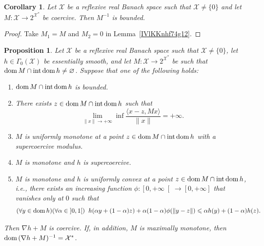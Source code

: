 \documentclass[a4paper,11pt,fleqn]{article}
\renewcommand{\leq}{\ensuremath{\leqslant}}
\newcommand{\pair}[2]{\langle{{#1},{#2}}\rangle}
\newcommand{\XX}{\ensuremath{{\mathcal X}}}
\newcommand{\emp}{\ensuremath{{\varnothing}}}
\newcommand{\pinf}{\ensuremath{{+\infty}}}
\newcommand{\dom}{\ensuremath{\text{\rm dom}\,}}
\newcommand{\intdom}{\ensuremath{\text{\rm int\,dom}\,}}
\newtheorem{corollary}[theorem]{Corollary}
\newtheorem{proposition}[theorem]{Proposition}
\theoremstyle{plain}{\theorembodyfont{\rmfamily}%
\newtheorem{conjecture}[theorem]{Conjecture}}
\theoremstyle{plain}{\theorembodyfont{\rmfamily}%
\newtheorem{example}[theorem]{Example}}
\theoremstyle{plain}{\theorembodyfont{\rmfamily}%
\newtheorem{remark}[theorem]{Remark}}
\theoremstyle{plain}{\theorembodyfont{\rmfamily}%
\newtheorem{algorithm}[theorem]{Algorithm}}
\theoremstyle{plain}{\theorembodyfont{\rmfamily}%
\newtheorem{condition}[theorem]{Condition}}
\theoremstyle{plain}{\theorembodyfont{\rmfamily}%
\newtheorem{definition}[theorem]{Definition}}
\theoremstyle{plain}{\theorembodyfont{\rmfamily}
\newtheorem{problem}[theorem]{Problem}}
\theoremstyle{plain}{\theorembodyfont{\rmfamily}
\newtheorem{notation}[theorem]{Notation}}
\numberwithin{equation}{section}
\begin{document}
\begin{corollary}
\label{IVcKKnhf74g12}
Let $\XX$ be a reflexive real Banach space such that 
$\XX\neq\{0\}$ and let $M\colon\XX\to 2^{\XX^*}$ be coercive.
Then $M^{-1}$ is bounded.
\end{corollary}
\begin{proof}
Take $M_1=M$ and $M_2=0$ in Lemma~\ref{IVlKKnhf74g12}.
\end{proof}

\begin{proposition}
\label{IVpp:20a}
Let $\XX$ be a reflexive real Banach space such that 
$\XX\neq\{0\}$, let $h\in\Gamma_0(\XX)$ be essentially smooth, 
and let $M\colon\XX\to 2^{\XX^*}$ be such that 
$\dom M\cap\intdom h\neq\emp$. Suppose that 
one of the following holds:
\begin{enumerate}
\item
\label{IVcl:20b1}
$\dom M\cap\intdom h$ is bounded.
\item
\label{IVcl:20b2}
There exists $z\in\dom M\cap\intdom h$ such that
\begin{equation}
\lim_{\|x\|\to+\infty}\inf\dfrac{\pair{x-z}{Mx}}{\|x\|}
=\pinf.
\end{equation} 
\item
\label{IVcl:20b3}
$M$ is uniformly monotone at a point 
$z\in\dom M\cap\intdom h$ with a
supercoercive modulus.
\item
\label{IVcl:20b4}
$M$ is monotone and $h$ is supercoercive.
\item
\label{IVcl:20b5}
$M$ is monotone and $h$ is uniformly convex at a point 
$z\in\dom M\cap\intdom h$, i.e., there exists an increasing 
function 
$\phi\colon\left[0,+\infty\right[\to\left[0,+\infty\right]$ 
that vanishes only at $0$ such that 
\begin{equation}
(\forall y\in\dom h)(\forall\alpha\in\left]0,1\right[)\;\;
h(\alpha y+(1-\alpha)z)+\alpha(1-\alpha)\phi(\|y-z\|)
\leq\alpha h(y)+(1-\alpha)h(z).
\end{equation}
\end{enumerate}
Then $\nabla h+M$ is coercive. If, in addition, $M$ is 
maximally monotone, then $\dom(\nabla h+M)^{-1}=\XX^*$.
\end{proposition}
\end{document}

